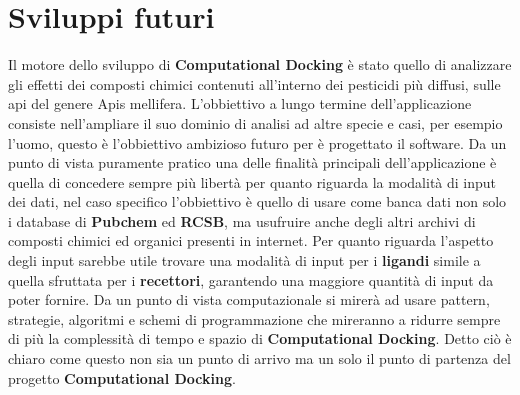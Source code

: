\section{Sviluppi futuri}
Il motore dello sviluppo di \textbf{Computational Docking} è stato quello di analizzare gli effetti dei composti chimici contenuti all'interno dei pesticidi più diffusi, sulle api del genere Apis mellifera. L'obbiettivo a lungo termine dell'applicazione consiste nell'ampliare il suo dominio di analisi ad altre specie e casi, per esempio l'uomo, questo è l'obbiettivo ambizioso futuro per è progettato il software.\newline
Da un punto di vista puramente pratico una delle finalità principali dell'applicazione è quella di concedere sempre più libertà per quanto riguarda la modalità di input dei dati, nel caso specifico l'obbiettivo è quello di usare come banca dati non solo i database di \textbf{Pubchem} ed \textbf{RCSB}, ma usufruire anche degli altri archivi di composti chimici ed organici presenti in internet. Per quanto riguarda l'aspetto degli input sarebbe utile trovare una modalità di input per i \textbf{ligandi} simile a quella sfruttata per i \textbf{recettori}, garantendo una maggiore quantità di input da poter fornire.\newline
Da un punto di vista computazionale si mirerà ad usare pattern, strategie, algoritmi e schemi di programmazione che mireranno a ridurre sempre di più la complessità di tempo e spazio di \textbf{Computational Docking}.\newline
Detto ciò è chiaro come questo non sia un punto di arrivo ma un solo il punto di partenza del progetto \textbf{Computational Docking}.










































